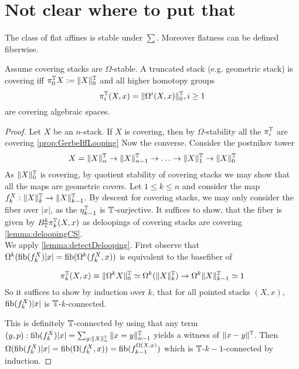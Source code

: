\documentclass{article}
\begin{document}
\section{Not clear where to put that}
\begin{theorem}[TODO]{\label{thm:FlatAffines}}
	The class of flat affines is stable under $\sum$. Moreover flatness can be defined fiberwise.
\end{theorem}
\begin{prop}{\label{prop:htpyGroups}}
	Assume covering stacks are $\Omega$-stable.
	A truncated stack (e.g. geometric stack) is covering iff $\pi_0^{\mathbb{T}} X := \|X\|_0^{\mathbb{T}}$ and all higher homotopy groups 
	\[
	\pi_i^{\mathbb{T}}(X,x) = \|\Omega^i (X , x)\|_0^{\mathbb{T}} , i \ge 1
	\]
	are covering algebraic spaces.
\end{prop}
\begin{proof}
	Let $X$ be an $n$-stack.
	If $X$ is covering, then by $\Omega$-stability all the $\pi_i^{\mathbb{T}}$ are covering \ref{prop:GerbeIffLooping} Now the converse.
	Consider the postnikov tower
	\[
	X = \|X\|_n^{\mathbb{T}} \to \|X\|_{n-1}^{\mathbb{T}} \to \hdots \to \|X\|_1^{\mathbb{T}} \to \|X\|_0^{\mathbb{T}} 
	\]
	As $\|X\|_0^{\mathbb{T}}$ is covering, by quotient stability of covering stacks we may show that all the maps are geometric covers. 
	Let $1 \le k \le n$ and consider the map $f_k^X : \|X\|_{k}^{\mathbb{T}} \to \|X\|_{k-1}^{\mathbb{T}}$. By descent for covering stacks, we may only consider the fiber over $|x|$, as the $\eta_{k-1}^{\mathbb{T}}$ is $\mathbb{T}$-surjective. 
	It suffices to show, that the fiber is given by $B_{\mathbb{T}}^k \pi^{\mathbb{T}}_k(X,x)$ as deloopings of covering stacks are covering \ref{lemma:deloopingCS}.\\	
	We apply \ref{lemma:detectDelooping}.
	First observe that $\Omega^k (\operatorname{fib}(f_k^X) |x| = \operatorname{fib} (\Omega^k (f_k^X , x))$ is equivalent to the basefiber of
	
	\[
	\pi_k^{\mathbb{T}}(X,x) \equiv \|\Omega^k X \|_0^{\mathbb{T}} \simeq \Omega^k(\|X\|_k^{\mathbb{T}}) \to \Omega^k \|X\|_{k-1}^{\mathbb{T}} \simeq 1
	\]
	So it suffices to show by induction over $k$, that for all pointed stacks $(X,x)$, $\operatorname{fib}(f_k^X) |x|$ is $\mathbb{T}$-$k$-connected.

	This is definitely $\mathbb{T}$-connected by using that any term $(y, p) : \operatorname{fib}(f_k^X) |x| = \sum_{y : \|X\|_n^{\mathbb{T}}} \|x = y\|_{n-1}^{\mathbb{T}}$ yields a witness of $\|x - y\|^{\mathbb{T}}$. Then $\Omega (\operatorname{fib}(f_k^X) |x| = \operatorname{fib} (\Omega (f_k^X , x)) = \operatorname{fib} (f_{k-1}^{\Omega (X , x)})$ which is $\mathbb{T}$-$k-1$-connected by induction.
\end{proof}





\end{document}
